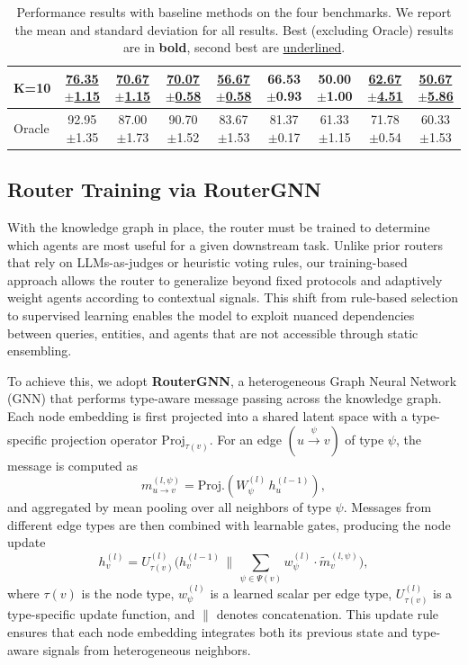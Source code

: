 \documentclass[11pt]{article}
\begin{document}
\begin{table}[t]
{\begin{tabular}{l *{8}{c}}
\quad\quad K=10& \underline{76.35$\pm$1.15} & \underline{70.67$\pm$1.15} & \underline{70.07$\pm$0.58} & \underline{56.67$\pm$0.58} & 66.53$\pm$0.93 & 50.00$\pm$1.00 & \underline{62.67$\pm$4.51} & \underline{50.67$\pm$5.86} \\
\midrule\midrule
Oracle         & 92.95$\pm$1.35 & 87.00$\pm$1.73 & 90.70$\pm$1.52 & 83.67$\pm$1.53 & 81.37$\pm$0.17 & 61.33$\pm$1.15 & 71.78$\pm$0.54 & 60.33$\pm$1.53 \\
\bottomrule
\end{tabular}
}
\vspace{-5pt}
\caption{Performance results with baseline methods on the four benchmarks. We report the mean and standard deviation for all results. Best (excluding Oracle) results are in \textbf{bold}, second best are \underline{underlined}.}
\label{tab:main_results}
\vspace{-15pt}
\end{table}

\subsection{Router Training via RouterGNN}

With the knowledge graph in place, the router must be trained to determine which agents are most useful for a given downstream task. Unlike prior routers that rely on LLMs-as-judges or heuristic voting rules, our training-based approach allows the router to generalize beyond fixed protocols and adaptively weight agents according to contextual signals. This shift from rule-based selection to supervised learning enables the model to exploit nuanced dependencies between queries, entities, and agents that are not accessible through static ensembling.

To achieve this, we adopt \textbf{RouterGNN}, a heterogeneous Graph Neural Network (GNN) that performs type-aware message passing across the knowledge graph. Each node embedding is first projected into a shared latent space with a type-specific projection operator $\mathrm{Proj}_{\tau(v)}$. For an edge $(u \xrightarrow{\psi} v)$ of type $\psi$, the message is computed as
\[
m^{(l,\psi)}_{u \to v} = \mathrm{Proj.}\!\left( W^{(l)}_{\psi}\, h^{(l-1)}_u \right),
\]
and aggregated by mean pooling over all neighbors of type $\psi$. Messages from different edge types are then combined with learnable gates, producing the node update
\[
h^{(l)}_v = U^{(l)}_{\tau(v)}\!\Big(h^{(l-1)}_v \,\|\, \sum_{\psi \in \Psi(v)} w^{(l)}_\psi \cdot \tilde{m}^{(l,\psi)}_v \Big),
\]
where $\tau(v)$ is the node type, $w^{(l)}_\psi$ is a learned scalar per edge type, $U^{(l)}_{\tau(v)}$ is a type-specific update function, and $\|$ denotes concatenation. This update rule ensures that each node embedding integrates both its previous state and type-aware signals from heterogeneous neighbors.
\end{document}

